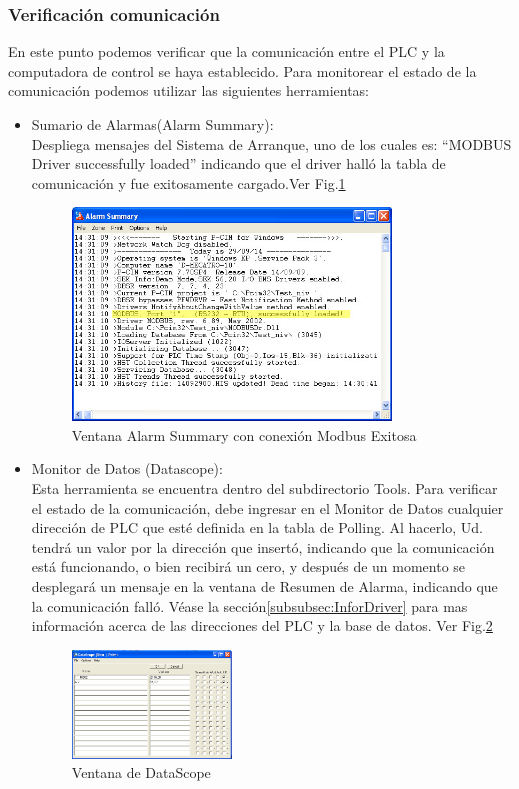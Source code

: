 \subsubsection{Verificación comunicación}
En este punto podemos verificar que la comunicación entre el PLC y la
computadora de control se haya establecido. Para monitorear el estado 
de la comunicación podemos utilizar las siguientes herramientas:
\begin{itemize}
 \item Sumario de Alarmas(Alarm Summary):\\
  Despliega mensajes del Sistema de Arranque, uno de los cuales es: “MODBUS
  Driver successfully loaded” indicando que el driver halló la tabla de 
  comunicación y fue exitosamente cargado.Ver Fig.\ref{fig:alarmsummary}
  \begin{figure}[!ht]
	\centering
	\includegraphics[width=0.8\textwidth]
	{Cap5-SCADA/images/alarm.jpeg}
	\caption{Ventana Alarm Summary con conexión Modbus Exitosa}
	\label{fig:alarmsummary}
  \end{figure}
 \item Monitor de Datos (Datascope):\\
  Esta herramienta se encuentra dentro del subdirectorio Tools.
  Para verificar el estado de la comunicación,
  debe ingresar en el Monitor de Datos cualquier dirección de PLC que esté 
  definida en la tabla de Polling. Al hacerlo, Ud. tendrá un valor por la 
  dirección que insertó,
  indicando que la comunicación está funcionando, o bien recibirá un cero, y
  después de un momento se desplegará un mensaje en la ventana de Resumen
  de Alarma, indicando que la comunicación falló. Véase la 
  sección\ref{subsubsec:InforDriver} para mas información acerca de las 
  direcciones del PLC y la base de datos. Ver 
  Fig.\ref{fig:dataScope}
  \begin{figure}[!ht]
	\centering
	\includegraphics[width=0.4\textwidth]
	{Cap5-SCADA/images/dataScope.jpeg}
	\caption{Ventana de DataScope}
	\label{fig:dataScope}
  \end{figure}
\end{itemize}


